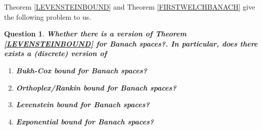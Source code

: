 \documentclass{amsart}
\newtheorem{question}[theorem]{Question}
\begin{document}
Theorem \ref{LEVENSTEINBOUND}  and Theorem \ref{FIRSTWELCHBANACH}  give  the following problem to us.
\begin{question}
	\textbf{ Whether there is a   version of Theorem \ref{LEVENSTEINBOUND} for Banach spaces?. In particular, does there exists a  (discrete) version of }
	\begin{enumerate}[\upshape(i)]
		\item  \textbf{ Bukh-Cox bound for Banach spaces?}
		\item  \textbf{ Orthoplex/Rankin bound for Banach spaces?}
		\item  \textbf{ Levenstein bound for Banach spaces?}
		\item  \textbf{ Exponential bound for Banach spaces?}
	\end{enumerate}		
\end{question}
 
\end{document}
